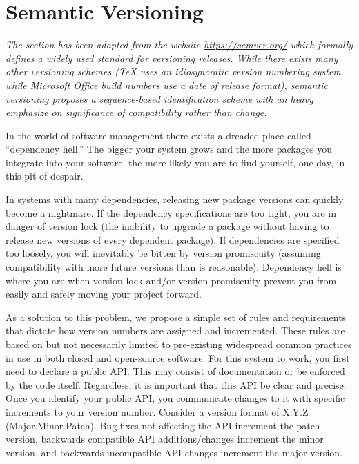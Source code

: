 \section{Semantic Versioning}

\begin{flushleft}
	\emph{The section has been adapted from the website \url{https://semver.org/}
		which formally defines a widely used standard for versioning releases. While there
		exists many other versioning schemes (TeX uses an idiosyncratic version numbering
		system while Microsoft Office build numbers use a date of release format), semantic
		versioning proposes a sequence-based identification scheme with an heavy emphasize on
		significance of compatibility rather than change.}
\end{flushleft}

\begin{flushleft}
	In the world of software management there exists a dreaded place called ``dependency hell.''
	The bigger your system grows and the more packages you integrate into your software, the
	more likely you are to find yourself, one day, in this pit of despair.
\end{flushleft}

\begin{flushleft}
	In systems with many dependencies, releasing new package versions can quickly become a nightmare.
	If the dependency specifications are too tight, you are in danger of version lock (the inability
	to upgrade a package without having to release new versions of every dependent package). If
	dependencies are specified too loosely, you will inevitably be bitten by version promiscuity
	(assuming compatibility with more future versions than is reasonable). Dependency hell is where
	you are when version lock and/or version promiscuity prevent you from easily and safely moving
	your project forward.
\end{flushleft}

\begin{flushleft}
	As a solution to this problem, we propose a simple set of rules and requirements that dictate
	how version numbers are assigned and incremented. These rules are based on but not necessarily
	limited to pre-existing widespread common practices in use in both closed and open-source software.
	For this system to work, you first need to declare a public API. This may consist of documentation
	or be enforced by the code itself. Regardless, it is important that this API be clear and precise.
	Once you identify your public API, you communicate changes to it with specific increments to your
	version number. Consider a version format of X.Y.Z (Major.Minor.Patch). Bug fixes not affecting
	the API increment the patch version, backwards compatible API additions/changes increment the minor
	version, and backwards incompatible API changes increment the major version.
\end{flushleft}

